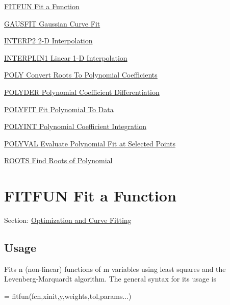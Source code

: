 
\begin{DoxyItemize}
\item \hyperlink{curvefit_fitfun}{F\-I\-T\-F\-U\-N Fit a Function}  
\item \hyperlink{curvefit_gausfit}{G\-A\-U\-S\-F\-I\-T Gaussian Curve Fit}  
\item \hyperlink{curvefit_interp2}{I\-N\-T\-E\-R\-P2 2-\/\-D Interpolation}  
\item \hyperlink{curvefit_interplin1}{I\-N\-T\-E\-R\-P\-L\-I\-N1 Linear 1-\/\-D Interpolation}  
\item \hyperlink{curvefit_poly}{P\-O\-L\-Y Convert Roots To Polynomial Coefficients}  
\item \hyperlink{curvefit_polyder}{P\-O\-L\-Y\-D\-E\-R Polynomial Coefficient Differentiation}  
\item \hyperlink{curvefit_polyfit}{P\-O\-L\-Y\-F\-I\-T Fit Polynomial To Data}  
\item \hyperlink{curvefit_polyint}{P\-O\-L\-Y\-I\-N\-T Polynomial Coefficient Integration}  
\item \hyperlink{curvefit_polyval}{P\-O\-L\-Y\-V\-A\-L Evaluate Polynomial Fit at Selected Points}  
\item \hyperlink{curvefit_roots}{R\-O\-O\-T\-S Find Roots of Polynomial}  
\end{DoxyItemize}\hypertarget{curvefit_fitfun}{}\section{F\-I\-T\-F\-U\-N Fit a Function}\label{curvefit_fitfun}
Section\-: \hyperlink{sec_curvefit}{Optimization and Curve Fitting} \hypertarget{vtkwidgets_vtkxyplotwidget_Usage}{}\subsection{Usage}\label{vtkwidgets_vtkxyplotwidget_Usage}
Fits {\ttfamily n} (non-\/linear) functions of {\ttfamily m} variables using least squares and the Levenberg-\/\-Marquardt algorithm. The general syntax for its usage is \begin{DoxyVerb}   = fitfun(fcn,xinit,y,weights,tol,params...)
\end{DoxyVerb}
